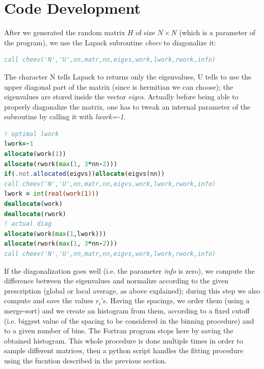 \documentclass{article}
\begin{document}
\section*{Code Development}
After we generated the random matrix $H$ of size $N \times N$ (which is a parameter of the program), we use the Lapack subroutine \textit{cheev} to diagonalize it:
\begin{lstlisting}[language=Fortran]
call cheev('N','U',nn,matr,nn,eigvs,work,lwork,rwork,info)
\end{lstlisting}
The character N tells Lapack to returns only the eigenvalues, U tells to use the upper diagonal part of the matrix (since is hermitian we can choose); the eigenvalues are stored inside the vector \textit{eigvs}. Actually before being able to properly diagonalize the matrix, one has to tweak an internal parameter of the subroutine by calling it with \textit{lwork=-1}.
\begin{lstlisting}[language=Fortran]
! optimal lwork
lwork=-1
allocate(work(1))
allocate(rwork(max(1, 3*nn-2)))
if(.not.allocated(eigvs))allocate(eigvs(nn))
call cheev('N','U',nn,matr,nn,eigvs,work,lwork,rwork,info)
lwork = int(real(work(1)))
deallocate(work)
deallocate(rwork)
! actual diag
allocate(work(max(1,lwork)))
allocate(rwork(max(1, 3*nn-2)))
call cheev('N','U',nn,matr,nn,eigvs,work,lwork,rwork,info)
\end{lstlisting}
If the diagonalization goes well (i.e. the parameter \textit{info} is zero), we compute the difference between the eigenvalues and normalize according to the given prescription (global or local average, as above explained); during this step we also compute and save the values $r_i$'s. Having the spacings, we order them (using a merge-sort) and we create an histogram from them, according to a fixed cutoff (i.e. biggest value of the spacing to be considered in the binning procedure)  and to a given number of bins. The Fortran program stops here by saving the obtained histogram. This whole procedure is done multiple times in order to sample different matrices, then a python script handles the fitting procedure using the fucntion described in the previous section.
\newpage
\end{document}
